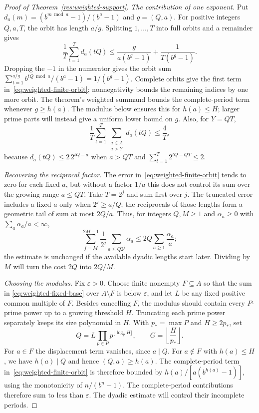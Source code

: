 \documentclass[11pt]{article}
\begin{document}
\begin{proof}[Proof of Theorem~\ref{res:weighted-support}]
\emph{The contribution of one exponent.}
Put $d_a(m)=(b^{m\bmod a}-1)/(b^a-1)$ and $g=(Q,a)$.
For positive integers $Q,a,T$, the orbit has length $a/g$. Splitting
$1,\ldots,T$ into full orbits and a remainder gives
\begin{equation}\label{eq:weighted-finite-orbit}
 \frac1T\sum_{t=1}^T d_a(tQ)
 \le \frac{g}{a(b^g-1)}+\frac1{T(b^g-1)}.
\end{equation}
Dropping the $-1$ in the numerator gives the orbit sum
$\sum_{t=1}^{a/g}b^{tQ\bmod a}/(b^a-1)=1/(b^g-1)$.
Complete orbits give the first term in~\eqref{eq:weighted-finite-orbit};
nonnegativity bounds the remaining indices by one more orbit.
The theorem's weighted summand bounds the complete-period term whenever
$g\ge h(a)$. The modulus below ensures this for $h(a)\le H$;
larger prime parts will instead give a uniform lower bound on $g$. Also, for $Y=QT$,
\begin{equation}\label{eq:weighted-outer-short}
 \frac1T\sum_{t=1}^T\sum_{\substack{a\in A\\a>Y}}d_a(tQ)
 \le\frac4T,
\end{equation}
because $d_a(tQ)\le2\,2^{tQ-a}$ when $a>QT$ and
$\sum_{t=1}^T2^{tQ-QT}\le2$.

\emph{Recovering the reciprocal factor.}
The error in~\eqref{eq:weighted-finite-orbit} tends to zero for each
fixed $a$, but without a factor $1/a$ this does not control its sum
over the growing range $a\le QT$. Take $T=2^j$ and sum first over
$j$. The truncated error includes a fixed $a$ only when $2^j\ge a/Q$;
the reciprocals of those lengths form a geometric tail of sum at most
$2Q/a$.
Thus, for integers $Q,M\ge1$ and $\alpha_a\ge0$ with
$\sum_a\alpha_a/a<\infty$,
\begin{equation}\label{eq:weighted-dyadic-short}
 \sum_{j=M}^{2M-1}\frac1{2^j}\sum_{a\le Q2^j}\alpha_a
 \le2Q\sum_{a\ge1}\frac{\alpha_a}{a};
\end{equation}
the estimate is unchanged if the available dyadic lengths start later.
Dividing by $M$ will turn the cost $2Q$ into $2Q/M$.

\emph{Choosing the modulus.}
Fix $\varepsilon>0$. Choose finite nonempty $F\subseteq A$ so that the sum in
\eqref{eq:weighted-fixed-base} over $A\setminus F$ is below $\varepsilon$, and
let $L$ be any fixed positive common multiple of $F$. Besides cancelling
$F$, the modulus should contain every $P$-prime power up to a growing
threshold $H$. Truncating each prime power separately keeps its size
polynomial in $H$. With $p_*=\max P$ and $H\ge2p_*$, set
\[
 Q=L\prod_{p\in P}p^{\lfloor\log_pH\rfloor},\qquad
 G=\left\lfloor\frac H{p_*}\right\rfloor.
\]
For $a\in F$ the displacement term vanishes, since $a\mid Q$.
For $a\notin F$ with $h(a)\le H$, we have $h(a)\mid Q$ and hence
$(Q,a)\ge h(a)$.  The complete-period term
in~\eqref{eq:weighted-finite-orbit} is therefore bounded by
$h(a)/[a(b^{h(a)}-1)]$, using the monotonicity of $n/(b^n-1)$.
The complete-period contributions therefore sum to less than
$\varepsilon$. The dyadic estimate will control their incomplete periods.


\end{proof}
\end{document}
